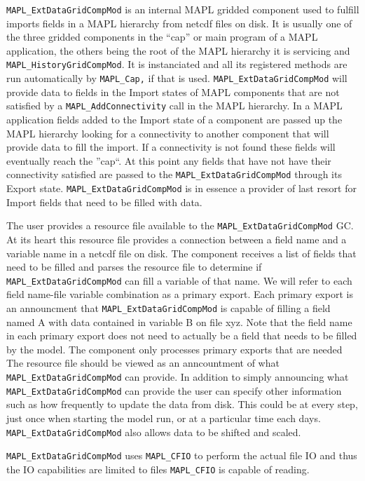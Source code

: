 {\tt MAPL\_ExtDataGridCompMod} is an internal MAPL gridded component 
used to fulfill imports fields in a MAPL hierarchy from netcdf files
on disk.
It is usually one of the
three gridded components in the ``cap'' or main program of a MAPL application,
the others being the root of the MAPL hierarchy it is servicing and {\tt MAPL\_HistoryGridCompMod}. It is
instanciated and all its registered methods are run automatically by
{\tt MAPL\_Cap,} if that is used.
{\tt MAPL\_ExtDataGridCompMod} will provide
data to fields in the Import states of MAPL components that are not satisfied by a \texttt{MAPL\_AddConnectivity} call
in the MAPL
hierarchy. In a MAPL application fields added to the Import state of a component
are passed up the MAPL hierarchy looking for a connectivity to another component that will
provide data to fill the import. If a connectivity is not found these fields will eventually reach
the ''cap``. At this point any fields that have not have their connectivity satisfied
are passed to the {\tt MAPL\_ExtDataGridCompMod} through its Export state.
{\tt MAPL\_ExtDataGridCompMod} is in essence a provider of last resort for Import fields that
need to be filled with data.

The user provides a resource file available to the {\tt MAPL\_ExtDataGridCompMod} GC.
At its heart this resource file provides a connection between a field name and a variable name in
a netcdf file on disk. The component receives a list of fields that need to be filled
and parses the resource file to determine if {\tt MAPL\_ExtDataGridCompMod} can fill a variable of that name.
We will refer to each field name-file variable combination as a primary export.
Each primary export is an
announcment that {\tt MAPL\_ExtDataGridCompMod} is capable of filling a field named A with data contained in variable B on file xyz.
Note that the field name in each primary export does not need to actually be a field
that needs to be filled by the model. The component only processes primary exports that are needed
The resource file should be viewed as an anncountment of what {\tt MAPL\_ExtDataGridCompMod} can provide.
In addition to simply announcing what {\tt MAPL\_ExtDataGridCompMod} can provide
the user can specify other information such as how frequently to update the data from
disk. This could be at every step, just once when starting the model run, or at a particular
time each days. {\tt MAPL\_ExtDataGridCompMod} also allows data to be shifted and scaled.

{\tt MAPL\_ExtDataGridCompMod} uses {\tt MAPL\_CFIO} to perform the actual file IO and thus the
IO capabilities are limited to files {\tt MAPL\_CFIO} is capable of reading.

